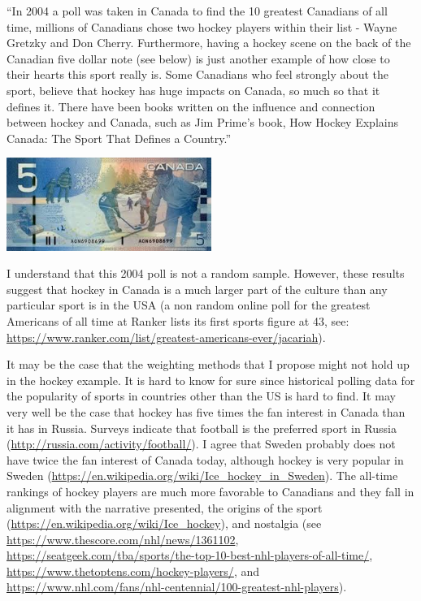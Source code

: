 \documentclass[11pt]{article}
\begin{document}
\noindent ``In 2004 a poll was taken in Canada to find the 10 greatest 
Canadians of all time, millions of Canadians chose two hockey players within 
their list - Wayne Gretzky and Don Cherry.  Furthermore, having a hockey scene 
on the back of the Canadian five dollar note (see below) is just another 
example of how close to their hearts this sport really is. Some Canadians who 
feel strongly about the sport, believe that hockey has huge impacts on Canada, 
so much so that it defines it. There have been books written on the influence 
and connection between hockey and Canada, such as Jim Prime's book, How Hockey 
Explains Canada: The Sport That Defines a Country.'' \\

\begin{center}
\includegraphics[width=0.50\textwidth]{canada5dollarbill.jpeg}
\end{center}

I understand that this 2004 poll is not a random sample.  However, these 
results suggest that hockey in Canada is a much larger part of the culture 
than any particular sport is in the USA (a non random online poll for the 
greatest Americans of all time at Ranker lists its first sports figure 
at 43, see:  
\url{https://www.ranker.com/list/greatest-americans-ever/jacariah}).  

It may be the case that the weighting methods that I propose might not hold 
up in the hockey example.  It is hard to know for sure since historical 
polling data for the popularity of sports in countries other than the US is 
hard to find.  It may very well be the case that hockey has five times the 
fan interest in Canada than it has in Russia.  Surveys indicate that 
football is the preferred sport in Russia 
(\url{http://russia.com/activity/football/}).  I agree that 
Sweden probably does not have twice the fan interest of Canada today, 
although hockey is very popular in Sweden 
(\url{https://en.wikipedia.org/wiki/Ice_hockey_in_Sweden}).  
The all-time rankings of hockey players are much more favorable to 
Canadians and they fall in alignment with the narrative presented, 
the origins of the sport (\url{https://en.wikipedia.org/wiki/Ice_hockey}), 
and nostalgia (see
\url{https://www.thescore.com/nhl/news/1361102}, 
\url{https://seatgeek.com/tba/sports/the-top-10-best-nhl-players-of-all-time/}, 
\url{https://www.thetoptens.com/hockey-players/}, 
and 
\url{https://www.nhl.com/fans/nhl-centennial/100-greatest-nhl-players}).
\end{document}
